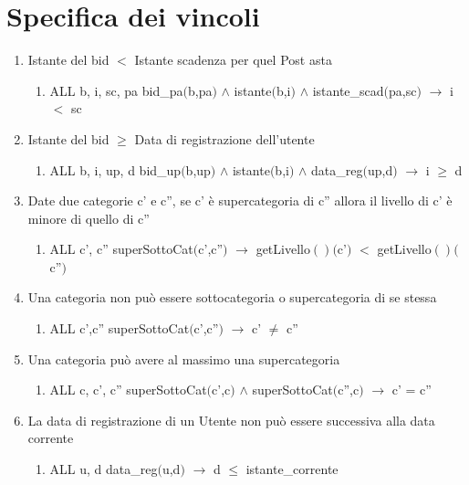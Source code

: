 \documentclass{article}
\begin{document}
\section{\label{sec:SpecificaVincoli}Specifica dei vincoli}
\begin{enumerate}
    
    \item Istante del bid $<$ Istante scadenza per quel Post asta
    \begin{enumerate}
        \item ALL b, i, sc, pa bid\_pa$($b,pa$)$ $\land$ istante$($b,i$)$ $\land$ istante\_scad$($pa,sc$)$ $\rightarrow$ i $<$ sc
    \end{enumerate}

    \item Istante del bid $\geq$ Data di registrazione dell'utente
    \begin{enumerate}
        \item ALL b, i, up, d bid\_up$($b,up$)$ $\land$ istante$($b,i$)$ $\land$ data\_reg$($up,d$)$ $\rightarrow$ i $\geq$ d
    \end{enumerate}

    \item Date due categorie c' e c'', se c' è supercategoria di c'' allora il livello di c' è minore di quello di c''
    \begin{enumerate}
        \item ALL c', c'' superSottoCat$($c',c''$)$ $\rightarrow$ getLivello$()($c'$)$ $<$ getLivello$()($c''$)$
    \end{enumerate}

    \item Una categoria non può essere sottocategoria o supercategoria di se stessa
    \begin{enumerate}
        \item ALL c',c'' superSottoCat$($c',c''$)$ $\rightarrow$ c' $\neq$ c''
    \end{enumerate}

    \item Una categoria può avere al massimo una supercategoria
    \begin{enumerate}
        \item ALL c, c', c'' superSottoCat$($c',c$)$ $\land$ superSottoCat$($c'',c$)$ $\rightarrow$ c' = c''
    \end{enumerate}

    \item La data di registrazione di un Utente non può essere successiva alla data corrente
    \begin{enumerate}
        \item ALL u, d data\_reg$($u,d$)$ $\rightarrow$ d $\leq$ istante\_corrente
    \end{enumerate}


\end{enumerate}
\end{document}

